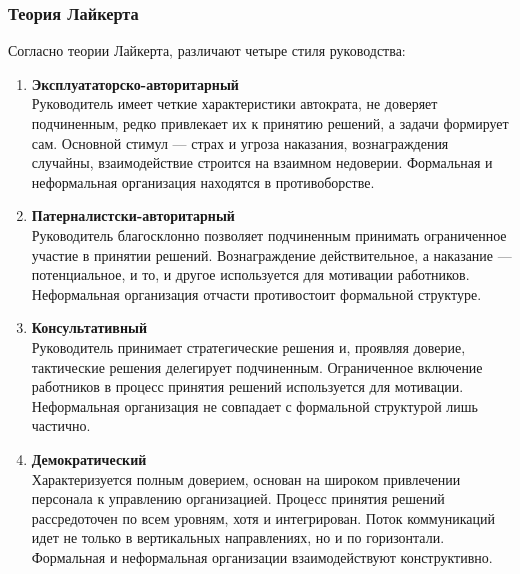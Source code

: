 \documentclass[a4paper,12pt,oneside,final]{extarticle}
\numberwithin{equation}{section}
\begin{document}
\subsubsection{Теория Лайкерта}
Согласно теории Лайкерта, различают четыре стиля руководства:
\begin{enumerate}
	\item \textbf{Эксплуататорско-авторитарный} \\
	Руководитель имеет четкие характеристики автократа, не доверяет подчиненным, редко привлекает их к принятию решений, а задачи формирует сам. 
	Основной стимул --- страх и угроза наказания, вознаграждения случайны, взаимодействие строится на взаимном недоверии. 
	Формальная и неформальная организация находятся в противоборстве.
	\item \textbf{Патерналистски-авторитарный} \\ 
	Руководитель благосклонно позволяет подчиненным принимать ограниченное участие в принятии решений. 
	Вознаграждение действительное, а наказание --- потенциальное, и то, и другое используется для мотивации работников. 
	Неформальная организация отчасти противостоит формальной структуре.
	\item \textbf{Консультативный} \\ 
	Руководитель принимает стратегические решения и, проявляя доверие, тактические решения делегирует подчиненным. 
	Ограниченное включение работников в процесс принятия решений используется для мотивации. 
	Неформальная организация не совпадает с формальной структурой лишь частично.
	\item \textbf{Демократический} \\ 
	Характеризуется полным доверием, основан на широком привлечении персонала к управлению организацией. 
	Процесс принятия решений рассредоточен по всем уровням, хотя и интегрирован. 
	Поток коммуникаций идет не только в вертикальных направлениях, но и по горизонтали. 
	Формальная и неформальная организации взаимодействуют конструктивно.
\end{enumerate}
\end{document}
